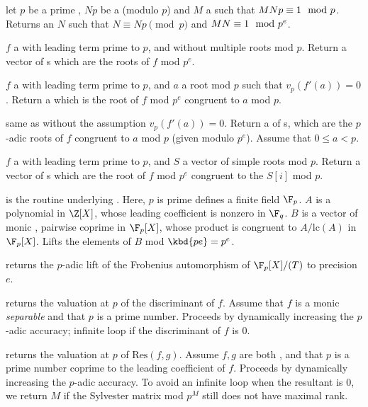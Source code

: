  let
$p$ be a prime , $Np$ be a  (modulo $p$) and
$M$ a  such that $M\*Np \equiv 1 \mod p$.
Returns an  $N$ such that $N \equiv Np \pmod{p}$ and
$M\*N \equiv 1 \mod p^e$.


 $f$ a  with leading
term prime to $p$, and without multiple roots mod $p$. Return a vector
of s which are the roots of $f$ mod $p^e$.

 $f$ a  with
leading term prime to $p$, and $a$ a root mod $p$ such that
$v_p(f'(a))=0$.  Return a  which is the root of $f$ mod $p^e$
congruent to $a$ mod $p$.

 same as 
without the assumption $v_p(f'(a)) = 0$. Return a  of s,
which are the $p$-adic roots of $f$ congruent to $a$ mod $p$ (given modulo
$p^e$). Assume that $0 \leq a < p$.

 $f$ a  with
leading term prime to $p$, and $S$ a vector of simple roots mod $p$. Return a
vector of s which are the root of $f$ mod $p^e$ congruent to the
$S[i]$ mod $p$.

 is
the routine underlying . Here, $p$ is prime
defines a finite field $\F_p$. $A$ is a polynomial in
$\Z[X]$, whose leading coefficient is nonzero in $\F_q$. $B$ is a vector of
monic , pairwise coprime in $\F_p[X]$, whose product is congruent to
$A/\text{lc}(A)$ in $\F_p[X]$. Lifts the elements of $B$ mod $\kbd{pe} = p^e$.

 returns the $p$-adic lift
of the Frobenius automorphism of $\F_p[X]/(T)$ to precision $e$.

 returns the valuation at $p$ of the
discriminant of $f$. Assume that $f$ is a monic \emph{separable} 
and that $p$ is a prime number. Proceeds by dynamically increasing the
$p$-adic accuracy; infinite loop if the discriminant of $f$ is
$0$.

 returns the
valuation at $p$ of $\text{Res}(f,g)$. Assume $f,g$ are both ,
and that $p$ is a prime number coprime to the leading coefficient of $f$.
Proceeds by dynamically increasing the $p$-adic accuracy.
To avoid an infinite loop when the resultant is $0$, we return $M$ if
the Sylvester matrix mod $p^M$ still does not have maximal rank.


